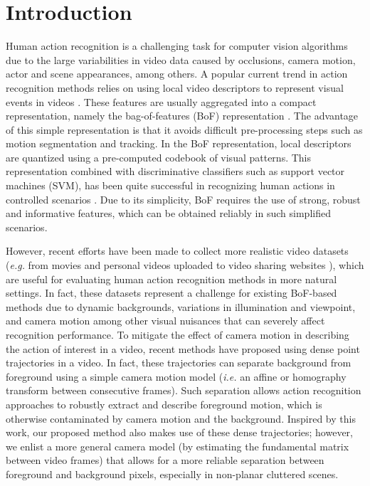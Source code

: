 \documentclass[runningheads]{llncs}
\begin{document}
\section{Introduction} \label{introduction}
Human action recognition is a challenging task for computer vision algorithms due to the large variabilities in video data caused by occlusions, camera motion, actor and scene appearances, among others. A popular current trend in action recognition methods relies on using local video descriptors to represent visual events in videos \cite{laptev2005, dollar2005, wang2011}. These features are usually aggregated into a compact representation, namely the bag-of-features (BoF) representation \cite{laptev2008}. The advantage of this simple representation is that it avoids difficult pre-processing steps such as motion segmentation and tracking. In the BoF representation, local descriptors are quantized using a pre-computed codebook of visual patterns. This representation combined with discriminative classifiers such as support vector machines (SVM), has been quite successful in recognizing human actions  in controlled scenarios \cite{blank2005, schuldt2004}. Due to its simplicity, BoF requires the use of strong, robust and informative features, which can be obtained reliably in such simplified scenarios.

However, recent efforts have been made to collect more realistic video datasets (\emph{e.g.} from movies and personal videos uploaded to video sharing websites  \cite{kuehne2011,  marszalek2009}), which are useful for evaluating human action recognition methods in more natural settings. In fact, these datasets represent a challenge for existing BoF-based methods due to dynamic backgrounds, variations in illumination and viewpoint, and camera motion among other visual nuisances that can severely affect recognition performance. To mitigate the effect of camera motion in describing the action of interest in a video, recent methods \cite{wang2013,wang2011} have proposed using dense point trajectories in a video. In fact, these trajectories can separate background from foreground using a simple camera motion model (\emph{i.e.} an affine or homography transform between consecutive frames). Such separation allows action recognition approaches to robustly extract and describe foreground motion, which is otherwise contaminated by camera motion and the background. Inspired by this work, our proposed method also makes use of these dense trajectories; however, we enlist a more general camera model (by estimating the fundamental matrix between video frames) that allows for a more reliable separation between foreground and background pixels, especially in non-planar cluttered scenes.
\end{document}
